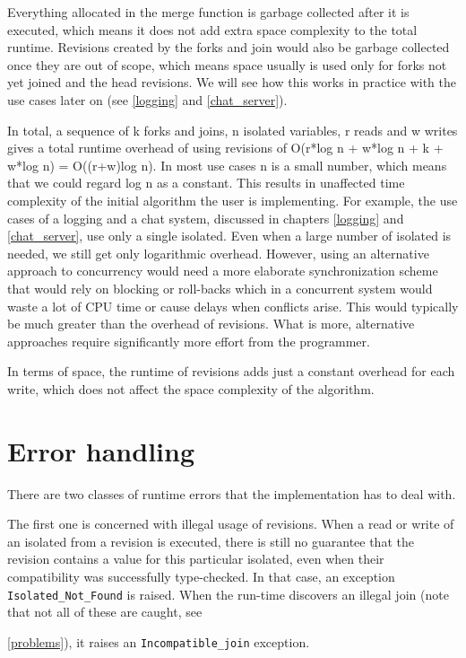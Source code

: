 \documentclass[12pt,twoside,notitlepage]{report}
\begin{document}
{Everything allocated in the merge function is garbage collected after it is executed, which means it does not add extra space complexity to the total runtime. Revisions created by the forks and join would also be garbage collected once they are out of scope, which means space usually is used only for forks not yet joined and the head revisions. We will see how this works in practice with the use cases later on (see \ref{logging} and \ref{chat_server}). 

In total, a sequence of k forks and joins, n isolated variables, r reads and w writes gives a total runtime overhead of using revisions of O(r*log n + w*log n + k + w*log n) = O((r+w)log n). In most use cases n is a small number, which means that we could regard log n as a constant. This results in unaffected time complexity of the initial algorithm the user is implementing. For example, the use cases of a logging and a chat system, discussed in chapters \ref{logging} and \ref{chat_server}, use only a single isolated. Even when a large number of isolated is needed, we still get only logarithmic overhead. However, using an alternative approach to concurrency would need a more elaborate synchronization scheme that would rely on blocking or roll-backs which in a concurrent system would waste a lot of CPU time or cause delays when conflicts arise. This would typically be much greater than the overhead of revisions. What is more, alternative approaches require significantly more effort from the programmer.

In terms of space, the runtime of revisions adds just a constant overhead for each write, which does not affect the space complexity of the algorithm.     

    

\section{Error handling}
\label{errors}
There are two classes of runtime errors that the implementation has to deal with.
 
The first one is concerned with illegal usage of revisions. When a read or write of an isolated from a revision is executed, there is still no guarantee that the revision contains a value for this particular isolated, even when their compatibility was successfully type-checked. In that case, an exception {\tt Isolated\_Not\_Found} is raised. When the run-time discovers an illegal join (note that not all of these are caught, see {\ref{problems}), it raises an {\tt Incompatible\_join} exception.

}}
\end{document}

